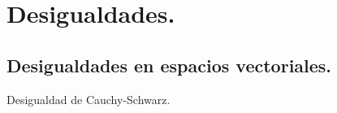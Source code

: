 \documentclass{article}
\title{}
\author{}
\begin{document}
\section{Desigualdades.}
\subsection{Desigualdades en espacios vectoriales.}

Desigualdad de Cauchy-Schwarz.
\end{document}
